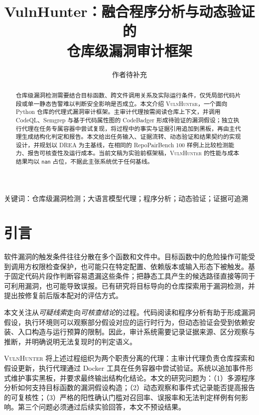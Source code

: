 \documentclass[times,twoside,watermark]{zHenriquesLab-StyleBioRxiv}
\newcommand{\VH}{\textsc{VulnHunter}}
\newcommand{\nan}{\texttt{nan}}
\begin{document}
\title{VulnHunter：融合程序分析与动态验证的\\仓库级漏洞审计框架}
\author[1]{作者待补充}
\maketitle

\begin{abstract}
仓库级漏洞检测需要结合目标函数、跨文件调用关系及实际运行条件，仅凭局部代码片段或单一静态告警难以判断安全影响是否成立。本文介绍 \VH{}，一个面向 Python 仓库的代理式漏洞审计框架。主审计代理按需阅读仓库上下文，并调用 CodeQL、Semgrep 与基于代码属性图的 CodeBadger 形成待验证的漏洞假设；独立执行代理在任务专属容器中尝试复现，将过程中的事实与证据引用追加到黑板，再由主代理生成结构化判定和报告。本文给出任务输入、证据流转、动态验证和结果契约的实现设计，并规划以 DREA 为主基线，在相同的 RepoPairBench 100 样例上比较检测能力、报告可核查性及运行成本。当前文稿为实验前框架稿，\VH{} 的性能与成本结果均以 \nan{} 占位，不据此主张系统优于任何基线。
\end{abstract}

\begin{keywords}
关键词：仓库级漏洞检测；大语言模型代理；程序分析；动态验证；证据可追溯
\end{keywords}

\section*{引言}
软件漏洞的触发条件往往分散在多个函数和文件中。目标函数中的危险操作可能受到调用方权限检查保护，也可能只在特定配置、依赖版本或输入形态下被触发。基于固定代码片段作判断容易遗漏这些条件；把静态工具产生的候选路径直接等同于可利用漏洞，也可能导致误报。已有研究将目标导向的仓库探索用于漏洞检测，并提出按修复前后版本配对的评估方式\cite{drea2026}。

本文关注从\emph{可疑线索}走向\emph{可核查结论}的过程。代码阅读和程序分析有助于形成漏洞假设，执行环境则可以观察部分假设对应的运行时行为，但动态验证会受到依赖安装、入口构造与运行预算的限制。因此，审计系统需要记录证据来源、区分观察与推断，并明确说明无法复现时的判定语义。

\VH{} 将上述过程组织为两个职责分离的代理：主审计代理负责仓库探索和假设更新，执行代理通过 Docker 工具在任务容器中尝试验证。系统以追加事件形式维护事实黑板，并要求最终输出结构化结论。本文的研究问题为：（1）多源程序分析如何支持目标函数的漏洞假设构造；（2）动态观察和事件式记录能否提高报告的可复核性；（3）严格的阳性确认门槛对召回率、误报率和无法判定样例有何影响。第三个问题必须通过后续实验回答，本文不预设结果。
\end{document}
